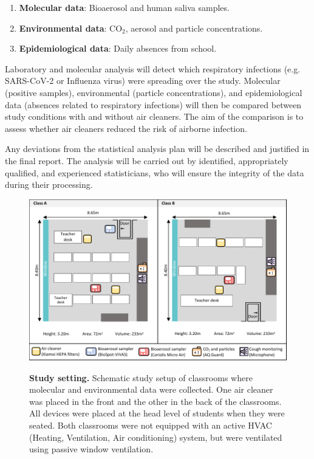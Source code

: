 \documentclass{article}
\begin{document}
\begin{enumerate}
    \item \textbf{Molecular data}: Bioaerosol and human saliva samples.
    \item \textbf{Environmental data}: CO$_2$, aerosol and particle concentrations.
    \item \textbf{Epidemiological data}: Daily absences from school.
\end{enumerate}
 
Laboratory and molecular analysis will detect which respiratory infections (e.g. SARS-CoV-2 or Influenza virus) were spreading over the study. Molecular (positive samples), environmental (particle concentrations), and epidemiological data (absences related to respiratory infections) will then be compared between study conditions with and without air cleaners. The aim of the comparison is to assess whether air cleaners reduced the risk of airborne infection. \smallskip

Any deviations from the statistical analysis plan will be described and justified in the final report. The analysis will be carried out by identified, appropriately qualified, and experienced statisticians, who will ensure the integrity of the data during their processing.

\begin{figure}[!htpb]
    \centering
    \caption{\textbf{Study setting.} Schematic study setup of classrooms where molecular and environmental data were collected. One air cleaner was placed in the front and the other in the back of the classrooms. All devices were placed at the head level of students when they were seated. Both classrooms were not equipped with an active HVAC (Heating, Ventilation, Air conditioning) system, but were ventilated using passive window ventilation.}
    \includegraphics{../study_setting.pdf}
    \label{fig:study_setting}
\end{figure}
\end{document}
